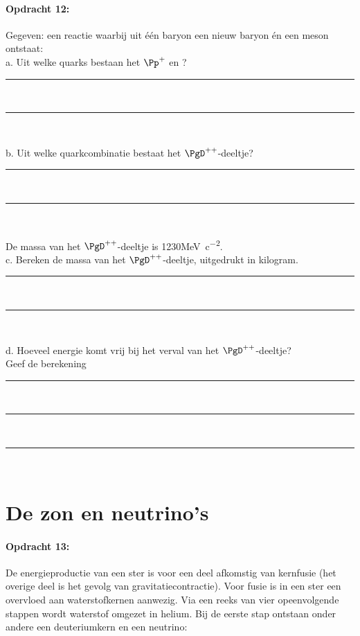 \paragraph{Opdracht 12:}
Gegeven: een reactie waarbij uit één baryon een nieuw baryon én een meson ontstaat:
\ce{\PgD^{++} -> \Pp^+ + \Ppiplus }\\
a. Uit welke quarks bestaan het $\Pp^+$ en \Ppiplus?
\begin{center}
    \rule{\textwidth}{0.3mm}\\
    \rule{\textwidth}{0.3mm}\\
\end{center}
b. Uit welke quarkcombinatie bestaat het $\PgD^{++}$-deeltje?
\begin{center}
    \rule{\textwidth}{0.3mm}\\
    \rule{\textwidth}{0.3mm}\\
\end{center}
De massa van het $\PgD^{++}$-deeltje is 1230\si{MeV.c^{-2}}.\\
c. Bereken de massa van het $\PgD^{++}$-deeltje, uitgedrukt in kilogram.
\begin{center}
    \rule{\textwidth}{0.3mm}\\
    \rule{\textwidth}{0.3mm}\\
\end{center}
d. Hoeveel energie komt vrij bij het verval van het $\PgD^{++}$-deeltje? \\
Geef de berekening
\begin{center}
    \rule{\textwidth}{0.3mm}\\
    \rule{\textwidth}{0.3mm}\\
    \rule{\textwidth}{0.3mm}\\
\end{center}

\section{De zon en neutrino's}

\paragraph{Opdracht 13:}
De energieproductie van een ster is voor een deel afkomstig van kernfusie 
(het overige deel is het gevolg van gravitatiecontractie). Voor fusie is in 
een ster een overvloed aan waterstofkernen aanwezig. Via een reeks van vier 
opeenvolgende stappen wordt waterstof omgezet in helium. Bij de eerste stap 
ontstaan onder andere een deuteriumkern en een neutrino:
 
